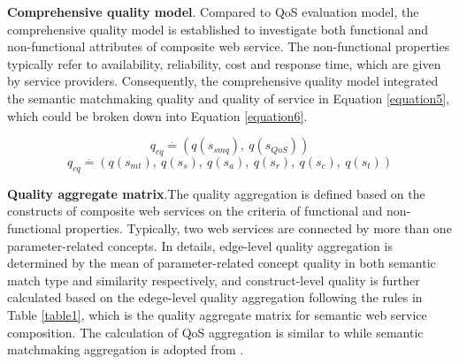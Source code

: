 \documentclass{llncs}
\begin{document}
\textbf{Comprehensive quality model}. Compared to QoS evaluation model, the comprehensive quality model is established to investigate both functional and non-functional attributes of composite web service. The non-functional properties typically refer to availability, reliability, cost and response time, which are given by service providers. Consequently, the comprehensive quality model integrated the semantic matchmaking quality and quality of service in Equation \ref{equation5}, which could be broken down into Equation \ref{equation6}.

\begin{equation}
\label{equation5}
q_{cq} \stackrel{.}{=} (q(s_ {smq}), \  q(s_ {QoS}))
\end{equation}
\begin{equation}
\label{equation6}
q_{cq} \stackrel{.}{=} (q(s_ {mt}), \  q(s_ {s}), \  q(s_{a}),\  q(s_{r}),\  q(s_{c}),\  q(s_{t}))
\end{equation}

\textbf{Quality aggregate matrix}.The quality aggregation is defined based on the constructs of composite web services on the criteria of functional and non-functional properties. Typically, two web services are connected by more than one parameter-related concepts. In details, edge-level quality aggregation is determined by the mean of parameter-related concept quality in both semantic match type and similarity respectively, and construct-level quality is further calculated based on the edege-level quality aggregation following the rules in Table \ref{table1}, which is the quality aggregate matrix for semantic web service composition. The calculation of QoS aggregation is similar to \cite{cardoso2004quality} while semantic matchmaking aggregation is adopted from \cite{lecue2009optimizing}.
\end{document}
